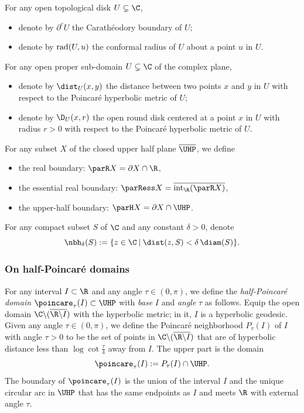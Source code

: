 \documentclass{amsart}
\begin{document}
For any open topological disk $U \subsetneq \C$, 
\begin{itemize}
    \item denote by $\partial^c U$ the Carath\'eodory boundary of $U$;
    \item denote by $\textnormal{rad}(U,u)$ the conformal radius of $U$ about a point $u$ in $U$.
\end{itemize}

For any open proper sub-domain $U \subsetneq \C$ of the complex plane, 
\begin{itemize}
    \item denote by $\dist_{U}(x,y)$ the distance between two points $x$ and $y$ in $U$ with respect to the Poincar\'e hyperbolic metric of $U$;
    \item denote by $\D_U(x,r)$ the open round disk centered at a point $x$ in $U$ with radius $r>0$ with respect to the Poincar\'e hyperbolic metric of $U$.
\end{itemize}

For any subset $X$ of the closed upper half plane $\overline{\UHP}$, we define
\begin{itemize}
    \item the real boundary: $\parR X = \partial X \cap \R$,
    \item the essential real boundary: $\parRess X = \overline{\textnormal{int}_{\R}(\parR X)}$,
    \item the upper-half boundary: $\parH X = \partial X \cap \UHP$.
\end{itemize}

For any compact subset $S$ of $\C$ and any constant $\delta > 0$, denote
\[
\nbh_{\delta}(S) := \{ z \in \C \: | \: \dist(z, S) < \delta \, \diam(S) \}.
\]

\subsubsection{On half-Poincar\'e domains}
\label{sss:poincare}

\begin{definition}
    For any interval $I \subset \R$ and any angle $\tau \in (0,\pi)$, we define the \emph{half-Poincar\'e domain} $\poincare_{\tau}(I) \subset \UHP$ with \emph{base} $I$ and \emph{angle} $\tau$ as follows.
    Equip the open domain $\C \backslash ( \overline{\R \backslash I} )$ with the hyperbolic metric; in it, $I$ is a hyperbolic geodesic. 
    Given any angle $\tau \in (0, \pi)$, we define the Poincar\'e neighborhood $P_\tau(I)$ of $I$ with angle $\tau>0$ to be the set of points in $\C \backslash ( \overline{\R \backslash I} )$ that are of hyperbolic distance less than $\log\cot\frac{\tau}{4}$ away from $I$. 
    The upper part is the domain
\[
    \poincare_\tau(I) := P_\tau(I) \cap \UHP.
\]
    The boundary of $\poincare_\tau(I)$ is the union of the interval $I$ and the unique circular arc in $\UHP$ that has the same endpoints as $I$ and meets $\R$ with external angle $\tau$.
\end{definition}
\end{document}
